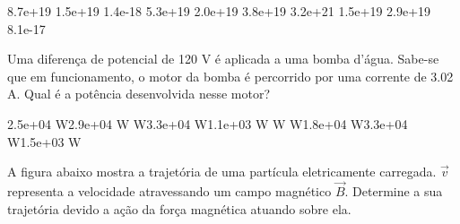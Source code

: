 \documentclass[12pt, addpoints]{exam}
\begin{document}
\begin{questions}
\begin{multicols*}{2}
\begin{oneparchoices}
\choice 8.7e+19 \choice 1.5e+19 \choice 1.4e-18 \choice 5.3e+19 \choice 2.0e+19 \choice 3.8e+19 \choice 3.2e+21 \choice 1.5e+19 \choice 2.9e+19 \choice 8.1e-17 
\end{oneparchoices}\question Uma diferença de potencial de 120 V é aplicada a uma bomba d’água. Sabe-se que em funcionamento, o motor da bomba é percorrido por uma corrente de    3.02 A. Qual é a potência desenvolvida nesse motor?

\begin{oneparchoices}
\choice 2.5e+04 W\choice 2.9e+04 W W\choice 3.3e+04 W\choice 1.1e+03 W W W\choice 1.8e+04 W\choice 3.3e+04 W\choice 1.5e+03 W
\end{oneparchoices}\question A ﬁgura abaixo mostra a trajetória de uma partícula eletricamente carregada. $\vec{{v}}$ representa a velocidade atravessando um campo magnético $\vec{{B}}$. Determine a sua trajetória devido a ação da força magnética atuando sobre ela.
        
        \begin{center}
            \begin{minipage}[c]{0.5\linewidth}
            \end{minipage}
        \end{center}

        


\end{multicols*}
\end{questions}
\end{document}
